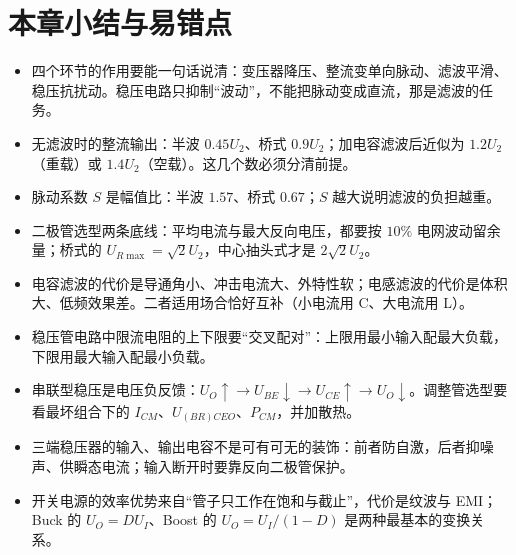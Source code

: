 \section{本章小结与易错点}
\begin{itemize}
    \item 四个环节的作用要能一句话说清：变压器降压、整流变单向脉动、滤波平滑、稳压抗扰动。稳压电路只抑制“波动”，不能把脉动变成直流，那是滤波的任务。
    \item 无滤波时的整流输出：半波 $0.45U_2$、桥式 $0.9U_2$；加电容滤波后近似为 $1.2U_2$（重载）或 $1.4U_2$（空载）。这几个数必须分清前提。
    \item 脉动系数 $S$ 是幅值比：半波 $1.57$、桥式 $0.67$；$S$ 越大说明滤波的负担越重。
    \item 二极管选型两条底线：平均电流与最大反向电压，都要按 $10\%$ 电网波动留余量；桥式的 $U_{R\max}=\sqrt2U_2$，中心抽头式才是 $2\sqrt2U_2$。
    \item 电容滤波的代价是导通角小、冲击电流大、外特性软；电感滤波的代价是体积大、低频效果差。二者适用场合恰好互补（小电流用 C、大电流用 L）。
    \item 稳压管电路中限流电阻的上下限要“交叉配对”：上限用最小输入配最大负载，下限用最大输入配最小负载。
    \item 串联型稳压是电压负反馈：$U_O\uparrow\to U_{BE}\downarrow\to U_{CE}\uparrow\to U_O\downarrow$。调整管选型要看最坏组合下的 $I_{CM}$、$U_{(BR)CEO}$、$P_{CM}$，并加散热。
    \item 三端稳压器的输入、输出电容不是可有可无的装饰：前者防自激，后者抑噪声、供瞬态电流；输入断开时要靠反向二极管保护。
    \item 开关电源的效率优势来自“管子只工作在饱和与截止”，代价是纹波与 EMI；Buck 的 $U_O=DU_I$、Boost 的 $U_O=U_I/(1-D)$ 是两种最基本的变换关系。
\end{itemize}
